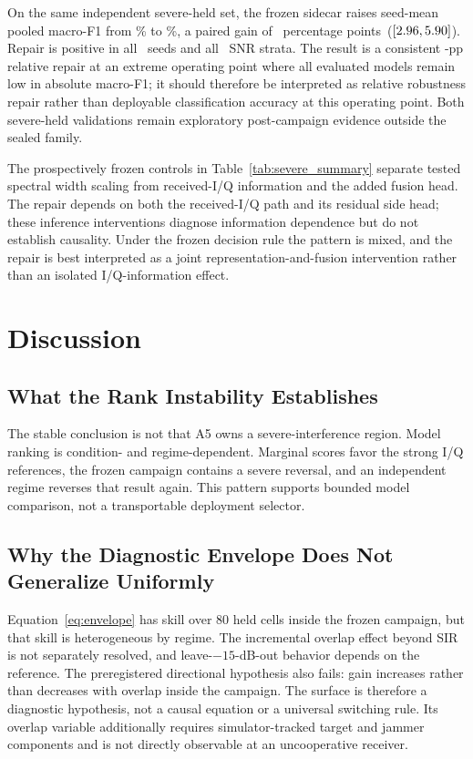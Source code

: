 \documentclass[letterpaper,journal]{IEEEtran}
\newcommand{\pp}{percentage points}
\begin{document}
On the same independent severe-held set, the frozen sidecar raises seed-mean
pooled macro-F1 from \SevereRepairLevelAFive\% to
\SevereRepairLevelSidecar\%, a paired gain of \SevereRepairDiff\ \pp\
($[2.96,5.90]$). Repair is positive in all
\SevereRepairPositiveSeeds\ seeds and all \SevereRepairPositiveSnrStrata\ SNR
strata. The result is a consistent \SevereRepairDiff-pp relative repair at an extreme
operating point where all evaluated models remain low in absolute macro-F1; it
should therefore be interpreted as relative robustness repair rather than
deployable classification accuracy at this operating point. Both severe-held
validations remain exploratory post-campaign evidence outside the sealed
family.

The prospectively frozen controls in Table~\ref{tab:severe_summary} separate
tested spectral width scaling from received-I/Q information and the added
fusion head. The repair depends on both the received-I/Q path and its residual
side head; these inference interventions diagnose information dependence but
do not establish causality. Under the frozen decision rule the pattern is
mixed, and the repair is best interpreted as a joint
representation-and-fusion intervention rather than an isolated
I/Q-information effect.

\section{Discussion}
\subsection{What the Rank Instability Establishes}
The stable conclusion is not that A5 owns a severe-interference region. Model
ranking is condition- and regime-dependent. Marginal scores favor the strong
I/Q references, the frozen campaign contains a severe reversal, and an
independent regime reverses that result again. This pattern supports bounded
model comparison, not a transportable deployment selector.

\subsection{Why the Diagnostic Envelope Does Not Generalize Uniformly}
Equation~\eqref{eq:envelope} has skill over 80 held cells inside the frozen
campaign, but that skill is heterogeneous by regime. The incremental overlap
effect beyond SIR is not separately resolved, and leave-$-15$-dB-out behavior
depends on the reference. The preregistered directional hypothesis also fails:
gain increases rather than decreases with overlap inside the campaign. The
surface is therefore a diagnostic hypothesis, not a causal equation or a
universal switching rule. Its overlap variable additionally requires
simulator-tracked target and jammer components and is not directly observable
at an uncooperative receiver.
\end{document}
